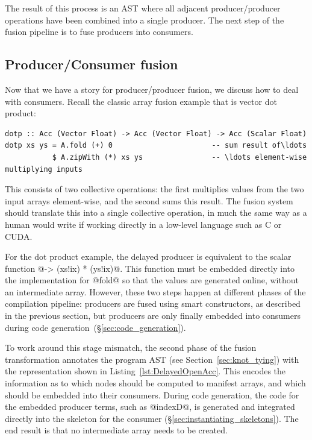 The result of this process is an AST where all adjacent producer/producer
operations have been combined into a single producer. The next step of the
fusion pipeline is to fuse producers into consumers.

\fusion[producer|)]{}

\subsection{Producer/Consumer fusion}
\label{sec:producer_consumer_fusion}
\fusion[consumer|(]{}

Now that we have a story for producer/producer fusion, we discuss how to deal
with consumers. Recall the classic array fusion example that is vector dot
product:

\begin{lstlisting}[style=haskell]
dotp :: Acc (Vector Float) -> Acc (Vector Float) -> Acc (Scalar Float)
dotp xs ys = A.fold (+) 0                       -- sum result of\ldots
           $ A.zipWith (*) xs ys                -- \ldots element-wise multiplying inputs
\end{lstlisting}
%
This consists of two collective operations: the first multiplies values from the
two input arrays element-wise, and the second sums this result. The fusion
system should translate this into a single collective operation, in much the
same way as a human would write if working directly in a low-level language such
as C or CUDA\@.

For the dot product example, the delayed producer is equivalent to the scalar
function @\ix -> (xs!ix) * (ys!ix)@. This function must be embedded directly
into the implementation for @fold@ so that the values are generated online,
without an intermediate array. However, these two steps happen at different
phases of the compilation pipeline: producers are fused using smart
constructors, as described in the previous section, but producers are only
finally embedded into consumers during code
generation~(\S\ref{sec:code_generation}).

To work around this stage mismatch, the second phase of the fusion
transformation annotates the program AST (see Section~\ref{sec:knot_tying}) with
the representation shown in Listing~\ref{lst:DelayedOpenAcc}. This encodes the
information as to which nodes should be computed to manifest arrays, and which
should be embedded into their consumers. During code generation, the code for
the embedded producer terms, such as @indexD@, is generated and integrated
directly into the skeleton for the consumer
(\S\ref{sec:instantiating_skeletons}). The end result is that no intermediate
array needs to be created.

